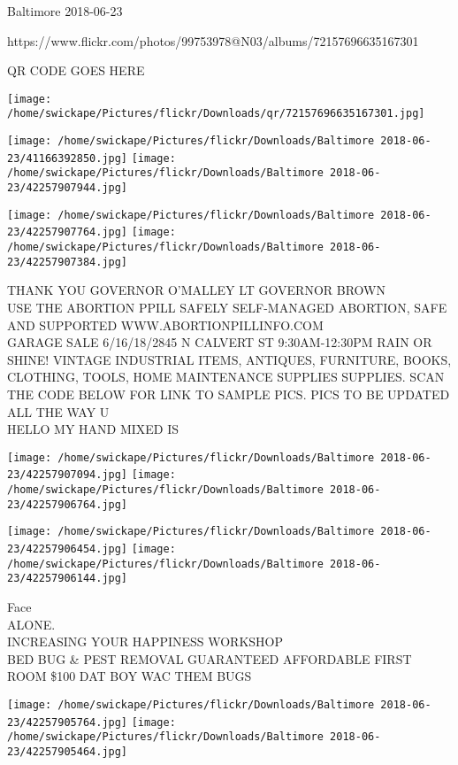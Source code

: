 \documentclass[10pt,letterpaper]{article}
\begin{document}
Baltimore 2018-06-23

https://www.flickr.com/photos/99753978@N03/albums/72157696635167301

QR CODE GOES HERE

\texttt{[image: /home/swickape/Pictures/flickr/Downloads/qr/72157696635167301.jpg]}
\pagebreak

\texttt{[image: /home/swickape/Pictures/flickr/Downloads/Baltimore 2018-06-23/41166392850.jpg]}
\texttt{[image: /home/swickape/Pictures/flickr/Downloads/Baltimore 2018-06-23/42257907944.jpg]}

\texttt{[image: /home/swickape/Pictures/flickr/Downloads/Baltimore 2018-06-23/42257907764.jpg]}
\texttt{[image: /home/swickape/Pictures/flickr/Downloads/Baltimore 2018-06-23/42257907384.jpg]}

THANK YOU GOVERNOR O'MALLEY LT GOVERNOR BROWN\\
USE THE ABORTION PPILL SAFELY SELF{-}MANAGED ABORTION, SAFE AND SUPPORTED WWW.ABORTIONPILLINFO.COM\\
GARAGE SALE 6/16/18/2845 N CALVERT ST 9:30AM{-}12:30PM RAIN OR SHINE!  VINTAGE INDUSTRIAL ITEMS, ANTIQUES, FURNITURE, BOOKS, CLOTHING, TOOLS, HOME MAINTENANCE SUPPLIES SUPPLIES.  SCAN THE CODE BELOW FOR LINK TO SAMPLE PICS.  PICS TO BE UPDATED ALL THE WAY U\\
HELLO MY HAND MIXED IS\\
\pagebreak

\texttt{[image: /home/swickape/Pictures/flickr/Downloads/Baltimore 2018-06-23/42257907094.jpg]}
\texttt{[image: /home/swickape/Pictures/flickr/Downloads/Baltimore 2018-06-23/42257906764.jpg]}

\texttt{[image: /home/swickape/Pictures/flickr/Downloads/Baltimore 2018-06-23/42257906454.jpg]}
\texttt{[image: /home/swickape/Pictures/flickr/Downloads/Baltimore 2018-06-23/42257906144.jpg]}

Face\\
ALONE.\\
INCREASING YOUR HAPPINESS WORKSHOP\\
BED BUG \& PEST REMOVAL GUARANTEED AFFORDABLE FIRST ROOM \$100 DAT BOY WAC THEM BUGS\\
\pagebreak

\texttt{[image: /home/swickape/Pictures/flickr/Downloads/Baltimore 2018-06-23/42257905764.jpg]}
\texttt{[image: /home/swickape/Pictures/flickr/Downloads/Baltimore 2018-06-23/42257905464.jpg]}
\end{document}
